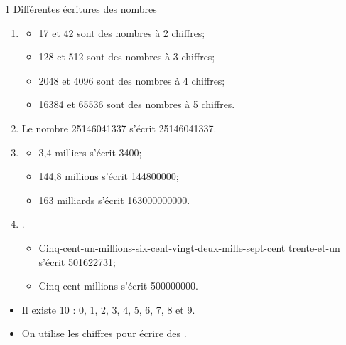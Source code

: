 \begin{myactrep}{1 Différentes écritures des nombres}
	
	\begin{enumerate}
		\item 
			\begin{itemize}
				\item 17 et 42 sont des nombres à 2 chiffres;
				\item 128 et 512 sont des nombres à 3 chiffres;
				\item \num{2048} et \num{4096} sont des nombres à 4 chiffres;
				\item \num{16384} et \num{65536} sont des nombres à 5 chiffres.
			\end{itemize}
		
		\item Le nombre 25146041337 s'écrit \num{25146041337}.
		\item 
			\begin{itemize}
				\item 3,4 milliers s'écrit \num{3400};
				\item 144,8 millions s'écrit \num{144800000};
				\item 163 milliards s'écrit \num{163000000000}.
			\end{itemize}
		
		\item .
			\begin{itemize}
				\item Cinq-cent-un-millions-six-cent-vingt-deux-mille-sept-cent trente-et-un s'écrit \num{501622731};
				\item Cinq-cent-millions s'écrit \num{500000000}.
			\end{itemize}

	\end{enumerate}
\end{myactrep}


\begin{mydefs}
	\begin{itemize}
		\item Il existe 10  : 0, 1, 2, 3, 4, 5, 6, 7, 8 et 9.
		
		\item On utilise les chiffres pour écrire des .
		
		
	\end{itemize}
\end{mydefs}

